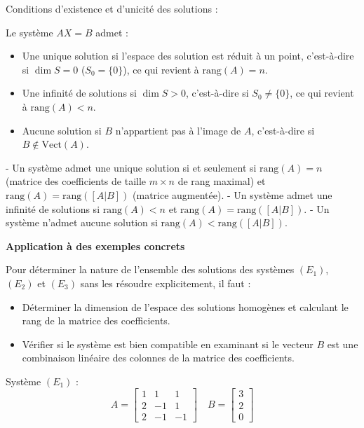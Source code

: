 \documentclass[10pt,a4paper]{article}
\begin{document}
\q Conditions d'existence et d'unicité des solutions :

Le système $AX = B$ admet :
\begin{itemize}
    \item Une unique solution si l'espace des solution est réduit à un point, c'est-à-dire si $\dim
    S = 0$ ($S_0 = \{0\}$), ce qui revient à $\text{rang}(A) = n$.
    \item Une infinité de solutions si $\dim S > 0$, c'est-à-dire si $S_0 \neq \{0\}$, ce qui
    revient à $\text{rang}(A) < n$.
    \item Aucune solution si $B$ n'appartient pas à l'image de $A$, c'est-à-dire si $B \notin
    \text{Vect}(A)$.
\end{itemize}


- Un système admet une unique solution si et seulement si \( \text{rang}(A)
   = n \) (matrice des coefficients de taille \( m \times n \) de rang maximal) et \( \text{rang}(A)
   = \text{rang}([A|B]) \) (matrice augmentée). - Un système admet une infinité de solutions si \(
   \text{rang}(A) < n \) et \( \text{rang}(A) = \text{rang}([A|B]) \). - Un système n'admet aucune
   solution si \( \text{rang}(A) < \text{rang}([A|B]) \).

\bigskip
\textbf{Application à des exemples concrets}

Pour déterminer la nature de l'ensemble des solutions des systèmes \((E_1)\), \((E_2)\) et \((E_3)\)
sans les résoudre explicitement, il faut :
\begin{itemize}
    \item Déterminer la dimension de l'espace des solutions homogènes et calculant le rang de la
    matrice des coefficients.
    \item Vérifier si le système est bien compatible en examinant si le vecteur \( B \) est une
    combinaison linéaire des colonnes de la matrice des coefficients.
\end{itemize}

Système \((E_1)\) :
\[
A =
\begin{bmatrix}
1 & 1 & 1 \\
2 & -1 & 1 \\
2 & -1 & -1
\end{bmatrix}
\quad
B = \begin{bmatrix} 3 \\ 2 \\ 0 \end{bmatrix}
\]
\end{document}
